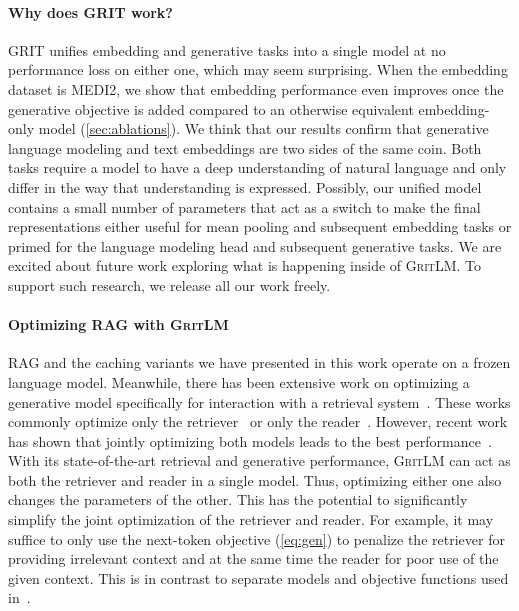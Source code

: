 \documentclass{article}
\newcommand{\model}{\textsc{GritLM}}
\newcommand{\method}{\textsc{GRIT}}
\begin{document}
\paragraph{Why does \method{} work?} \method{} unifies embedding and generative tasks into a single model at no performance loss on either one, which may seem surprising. When the embedding dataset is MEDI2, we show that embedding performance even improves once the generative objective is added compared to an otherwise equivalent embedding-only model (\autoref{sec:ablations}). We think that our results confirm that generative language modeling and text embeddings are two sides of the same coin. Both tasks require a model to have a deep understanding of natural language and only differ in the way that understanding is expressed. Possibly, our unified model contains a small number of parameters that act as a switch to make the final representations either useful for mean pooling and subsequent embedding tasks or primed for the language modeling head and subsequent generative tasks. We are excited about future work exploring what is happening inside of \model{}. To support such research, we release all our work freely.

\paragraph{Optimizing RAG with \model{}} RAG and the caching variants we have presented in this work operate on a frozen language model. Meanwhile, there has been extensive work on optimizing a generative model specifically for interaction with a retrieval system~\cite{gao2024retrievalaugmented,zhu2024large,asai2023retrieval}. These works commonly optimize only the retriever~\cite{shi2023replug} or only the reader~\cite{borgeaud2022improving,yasunaga2023retrievalaugmented,asai2023selfrag,luo2023sail}. However, recent work has shown that jointly optimizing both models leads to the best performance~\cite{lin2023radit}. With its state-of-the-art retrieval and generative performance, \model{} can act as both the retriever and reader in a single model. Thus, optimizing either one also changes the parameters of the other. This has the potential to significantly simplify the joint optimization of the retriever and reader. For example, it may suffice to only use the next-token objective (\autoref{eq:gen}) to penalize the retriever for providing irrelevant context and at the same time the reader for poor use of the given context. This is in contrast to separate models and objective functions used in~\citet{lin2023radit}.
\end{document}

